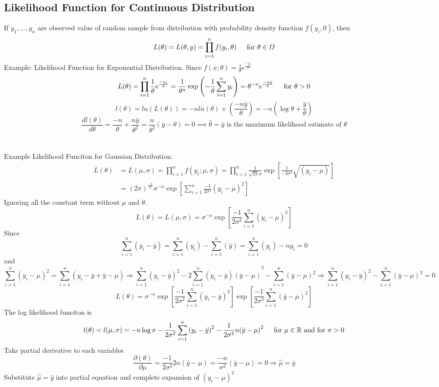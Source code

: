 \documentclass{article}
\newcommand{\R}{\mathbb{R}}
\newcommand{\sqr}[1]{{#1}^2}
\begin{document}
\newpage
\subsection{Likelihood Function for Continuous Distribution}
If $y_1, \dotsc, y_n$ are observed value of random sample from distribution with probability density function $f(y_i, 0)$, then
$$L(\theta) = L(\theta,y) = \prod_{i=1}^{n}f(y_i, \theta) \indent \text{for }\theta \in \varOmega$$
Example: Likelihood Function for Exponential Distribution.
Since $f(x;\theta) = \frac{1}{\theta}e^{\frac{-y_i}{\theta}}$
$$L(\theta) = \prod_{i=1}^{n}\frac{1}{\theta} e^{\frac{-y_i}{\theta}} = \frac{1}{\theta^n}\exp\left(-\frac{1}{\theta}\sum_{i=1}^{n}y_i\right) = \theta^{-n}e^{\frac{-n\bar{y}}{\theta}} \indent \text{for }\theta > 0$$
$$l(\theta) = ln(L(\theta)) = -nln(\theta) + (\frac{-n\bar{y}}{\theta}) = -n(\log\theta+\frac{\bar{y}}{\theta})$$
$$\frac{dl(\theta)}{d\theta} = \frac{-n}{\theta} + \frac{n\bar{y}}{\sqr{\theta}} = \frac{n}{\sqr{\theta}}\left(\bar{y} - \theta\right) = 0 \implies \hat{\theta} = \bar{y} \text{ is the maximum likelihood estimate of } \theta$$\\\\
\noindent Example Likelihood Funciton for Gaussian Distribution.
\begin{align*}
    L(\theta) &= L(\mu, \sigma) = \prod_{i=1}^{n}f(y_i; \mu, \sigma) = \prod_{i=1}^{n}\frac{1}{\sqrt{2\pi}\sigma}\exp\left[\frac{1}{-2\sqr{\sigma}}\sqrt{(y_i - \mu)}\right]\\
&= (2\pi)^{\frac{-\pi}{2}}\sigma^{-n}\exp\left[\sum_{i=1}^{n}\frac{-1}{2\sqr{\sigma}}\sqr{(y_i - \mu)}\right]
\end{align*}
Ignoring all the constant term without $\mu$ and $\theta$.
$$L(\theta) = L(\mu,\sigma) = \sigma^{-n}\exp\left[\frac{-1}{2\sqr{\sigma}}\sum_{i=1}^{n}\sqr{(y_i - \mu)}\right]$$
Since
$$\sum_{i=1}^{n}(y_i - \bar{y}) = \sum_{i=1}^{n}(y_i) - \sum_{i=1}^{n}(\bar{y}) = \sum_{i=1}^{n}(y_i) - ny_i = 0$$
and
\[
\sum_{i=1}^{n}\sqr{(y_i - \mu)} = \sum_{i=1}^{n}\sqr{(y_i - \bar{y} + \bar{y} - \mu)\Rightarrow \sum_{i=1}^{n}\sqr{(y_i - \bar{y})} - 2\sum_{i=1}^{n}(y_i - \bar{y})(\bar{y} - \mu)} - \sum_{i=1}^{n}\sqr{(\bar{y} - \mu)} \Rightarrow \sum_{i=1}^{n}\sqr{(y_i - \bar{y})} - \sum_{i=1}^{n}\sqr{(\bar{y} - \mu)} = 0
\]
\[
L(\theta) = \sigma^{-n}\exp\left[\frac{-1}{2\sqr{\sigma}}\sum_{i=1}^{n}\sqr{(y_i - \bar{y})}\right]\exp\left[\frac{-1}{2\sqr{\sigma}}\sum_{i=1}^{n}\sqr{(\bar{y} - \mu)}\right]
\]
The log likelihood funciton is
\[
l(\theta) = l(\mu, \sigma) = -n\log\sigma - \frac{1}{2\sqr{\sigma}}\sum_{i=1}^{n}\sqr{(y_i - \bar{y})} - \frac{1}{2\sqr{\sigma}}n\sqr{(\bar{y} - \mu)} \indent \text{for } \mu \in \R \text{ and for } \sigma > 0
\]
Taks partial derivative to each variables
\[
\frac{\partial(\theta)}{\partial \mu} = \frac{-1}{2\sqr{\sigma}}2n(\bar{y} - \mu) = \frac{-n}{\sqr{\sigma}}(\bar{y} - \mu) = 0 \Rightarrow \hat{\mu} = \bar{y}
\]
Substitute $\hat{\mu} = \bar{y}$ into partial equation and complete expansion of $\sqr{(y_i - \mu)}$
\end{document}
